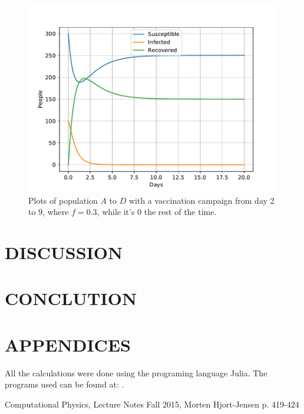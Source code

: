 \documentclass[a4paper]{article}
\let\Oldsection\section
\renewcommand{\section}{\FloatBarrier\Oldsection}
\begin{document}
\begin{figure}[!htb]
	\includegraphics[scale=0.56]{../plots/opp_e_fd.pdf}
	\caption{Plots of population $A$ to $D$ with a vaccination campaign from day 2 to 9, where $f=0.3$, while it's 0 the rest of the time.}
	\label{opp_e2}
\end{figure}



\section{DISCUSSION}



\section{CONCLUTION}




\section{APPENDICES}
All the calculations were done using the programing language Julia. The programs used can be found at:
\url{}.
	
\begin{thebibliography}{9}
	Computational Physics, Lecture Notes Fall 2015, Morten Hjort-Jensen p. 419-424
\end{thebibliography}
\end{document}
